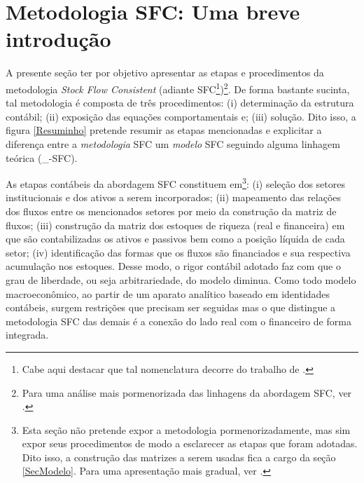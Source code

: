 \section{Metodologia SFC: Uma breve introdução}
\label{IntroSFC}


A presente seção ter por objetivo apresentar as etapas e procedimentos da metodologia \textit{Stock Flow Consistent} (adiante SFC\footnote{Cabe aqui destacar que tal nomenclatura decorre do trabalho de \textcite{dos_santos_keynesian_2006}.})\footnote{Para uma análise mais pormenorizada das linhagens da abordagem SFC, ver \textcite{caverzasi_stock-flow_2013}.}. De forma bastante sucinta, tal metodologia é composta de três procedimentos: (i) determinação da estrutura contábil; (ii) exposição das equações comportamentais e; (iii) solução. Dito isso, a figura \ref{Resuminho} pretende resumir as etapas mencionadas e explicitar a diferença entre a \textit{metodologia} SFC um \textit{modelo} SFC seguindo alguma linhagem teórica (_-SFC). 



As etapas contábeis da abordagem SFC constituem em\footnote{Esta seção não pretende expor a metodologia pormenorizadamente, mas sim expor seus procedimentos de modo a esclarecer as etapas que foram adotadas. Dito isso, a construção das matrizes a serem usadas fica a cargo da seção \ref{SecModelo}. Para uma apresentação mais gradual, ver \textcite[Capítulo 4]{da_silveira_politica_2017}.}: (i) seleção dos setores institucionais e dos ativos a serem incorporados; (ii) mapeamento das relações dos fluxos entre os mencionados setores por meio da construção da matriz de fluxos; (iii) construção da matriz dos estoques de riqueza (real e financeira) em que são contabilizadas os ativos e passivos  bem como a posição líquida de cada setor; (iv) identificação das formas que os fluxos são financiados e sua respectiva acumulação nos estoques. Desse modo, o rigor contábil adotado faz com que o grau de liberdade, ou seja arbitrariedade, do modelo diminua. Como todo modelo macroeconômico, ao partir de um aparato analítico baseado em identidades contábeis, surgem restrições que precisam ser seguidas mas o que distingue a metodologia SFC das demais é a conexão do lado real com o financeiro de forma integrada.

